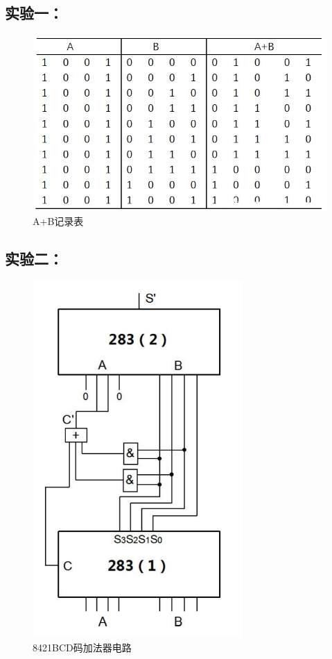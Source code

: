 \documentclass[a4paper,11pt,UTF8]{ctexart}
\begin{document}
 \subsection{实验一：\expa}
 \begin{figure}[H]
  \centering
  \includegraphics[width=12cm]{jfqpic9}
  \caption{A+B记录表}
  \label{fig:jfqpic9}
 \end{figure}












 
 \subsection{实验二：\expb}
 \begin{figure}[H]
  \centering
  \includegraphics[width=8cm]{jfqpic10}
  \caption{8421BCD码加法器电路}
  \label{fig:jfqpic10}
 \end{figure}
 
\end{document}

